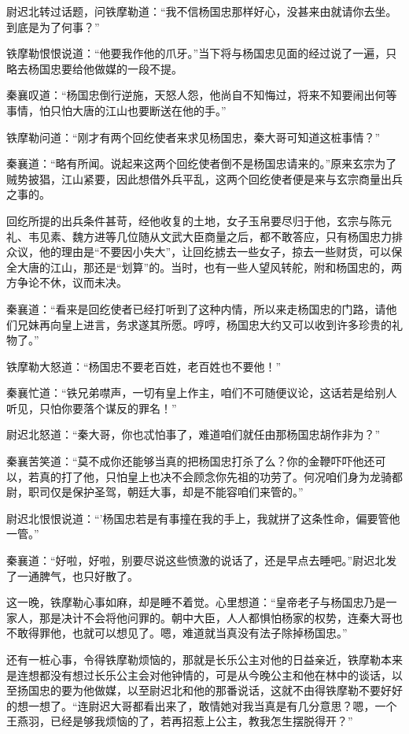 \documentclass[12pt,oneside]{book}
\begin{document}
尉迟北转过话题，问铁摩勒道：``我不信杨国忠那样好心，没甚来由就请你去坐。到底是为了何事？''

铁摩勒恨恨说道：``他要我作他的爪牙。''当下将与杨国忠见面的经过说了一遍，只略去杨国忠要给他做媒的一段不提。

秦襄叹道：``杨国忠倒行逆施，天怒人怨，他尚自不知悔过，将来不知要闹出何等事情，怕只怕大唐的江山也要断送在他的手。''

铁摩勒问道：``刚才有两个回纥使者来求见杨国忠，秦大哥可知道这桩事情？''

秦襄道：``略有所闻。说起来这两个回纥使者倒不是杨国忠请来的。''原来玄宗为了贼势披猖，江山紧要，因此想借外兵平乱，这两个回纥使者便是来与玄宗商量出兵之事的。

回纥所提的出兵条件甚苛，经他收复的土地，女子玉帛要尽归于他，玄宗与陈元礼、韦见素、魏方进等几位随从文武大臣商量之后，都不敢答应，只有杨国忠力排众议，他的理由是``不要因小失大''，让回纥掳去一些女子，掠去一些财货，可以保全大唐的江山，那还是``划算''的。当时，也有一些人望风转舵，附和杨国忠的，两方争论不休，议而未决。

秦襄道：``看来是回纥使者已经打听到了这种内情，所以来走杨国忠的门路，请他们兄妹再向皇上进言，务求遂其所愿。哼哼，杨国忠大约又可以收到许多珍贵的礼物了。''

铁摩勒大怒道：``杨国忠不要老百姓，老百姓也不要他！''

秦襄忙道：``铁兄弟噤声，一切有皇上作主，咱们不可随便议论，这话若是给别人听见，只怕你要落个谋反的罪名！''

尉迟北怒道：``秦大哥，你也忒怕事了，难道咱们就任由那杨国忠胡作非为？''

秦襄苦笑道：``莫不成你还能够当真的把杨国忠打杀了么？你的金鞭吓吓他还可以，若真的打了他，只怕皇上也决不会顾念你先祖的功劳了。何况咱们身为龙骑都尉，职司仅是保护圣驾，朝廷大事，却是不能容咱们来管的。''

尉迟北恨恨说道：``'杨国忠若是有事撞在我的手上，我就拼了这条性命，偏要管他一管。''

秦襄道：``好啦，好啦，别要尽说这些愤激的说话了，还是早点去睡吧。''尉迟北发了一通脾气，也只好散了。

这一晚，铁摩勒心事如麻，却是睡不着觉。心里想道：``皇帝老子与杨国忠乃是一家人，那是决计不会将他问罪的。朝中大臣，人人都惧怕杨家的权势，连秦大哥也不敢得罪他，也就可以想见了。嗯，难道就当真没有法子除掉杨国忠。''

还有一桩心事，令得铁摩勒烦恼的，那就是长乐公主对他的日益亲近，铁摩勒本来是连想都没有想过长乐公主会对他钟情的，可是从今晚公主和他在林中的谈话，以至扬国忠的要为他做媒，以至尉迟北和他的那番说话，这就不由得铁摩勒不要好好的想一想了。``连尉迟大哥都看出来了，敢情她对我当真是有几分意思？嗯，一个王燕羽，已经是够我烦恼的了，若再招惹上公主，教我怎生摆脱得开？''
\end{document}

